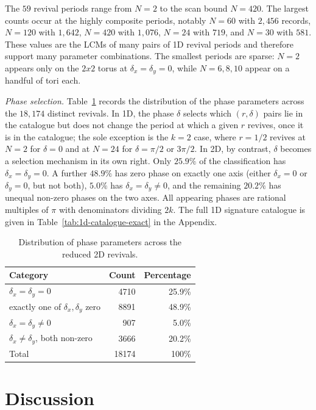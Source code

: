 \documentclass[aps,pra,reprint,amsmath,amssymb,superscriptaddress,floatfix]{revtex4-2}
\def\times{x}%
\def\rho{r}%
\begin{document}
\par
The $59$ revival periods range from $N = 2$ to the scan bound
$N = 420$. The largest counts occur at the highly composite
periods, notably $N = 60$ with $2{,}456$ records, $N = 120$ with
$1{,}642$, $N = 420$ with $1{,}076$, $N = 24$ with $719$, and
$N = 30$ with $581$. These values are the LCMs of many pairs of
1D revival periods and therefore support many parameter
combinations. The smallest periods are sparse: $N = 2$ appears
only on the $2 \times 2$ torus at $\delta_x = \delta_y = 0$, while
$N = 6, 8, 10$ appear on a handful of tori each.
\par
\emph{Phase selection.}
Table~\ref{tab:delta-summary} records the distribution of the
phase parameters across the $18{,}174$ distinct revivals. In 1D,
the phase $\delta$ selects which $(\rho, \delta)$ pairs lie in the
catalogue but does not change the period at which a given $\rho$
revives, once it is in the catalogue; the sole exception is the
$k = 2$ case, where $\rho = 1/2$ revives at $N = 2$ for
$\delta = 0$ and at $N = 24$ for $\delta = \pi/2$ or $3\pi/2$. In
2D, by contrast, $\delta$ becomes a selection mechanism in its own
right. Only $25.9\%$ of the classification has
$\delta_x = \delta_y = 0$. A further $48.9\%$ has zero phase on
exactly one axis (either $\delta_x = 0$ or $\delta_y = 0$, but not
both), $5.0\%$ has $\delta_x = \delta_y \neq 0$, and the remaining
$20.2\%$ has unequal non-zero phases on the two axes. All appearing
phases are rational multiples of $\pi$ with denominators dividing
$2k$. The full 1D signature catalogue is given in
Table~\ref{tab:1d-catalogue-exact} in the Appendix.
\par
\begin{table}[htbp]
\centering
\caption{Distribution of phase parameters across the reduced 2D revivals.}
\label{tab:delta-summary}
\begin{tabular}{lrr}
\toprule
Category & Count & Percentage \\
\midrule
$\delta_x = \delta_y = 0$ & 4710 & 25.9\% \\
exactly one of $\delta_x,\delta_y$ zero & 8891 & 48.9\% \\
$\delta_x = \delta_y \neq 0$ & 907 & 5.0\% \\
$\delta_x \neq \delta_y$, both non-zero & 3666 & 20.2\% \\
\midrule
Total & 18174 & 100\% \\
\bottomrule
\end{tabular}
\end{table}
\section{\label{sec:discussion}Discussion}\par
\end{document}
